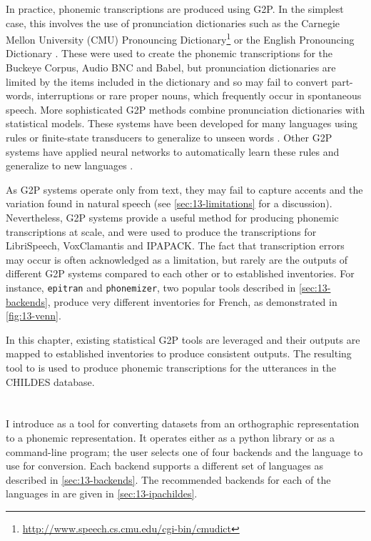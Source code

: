 In practice, phonemic transcriptions are produced using G2P. In the simplest case, this involves the use of pronunciation dictionaries such as the Carnegie Mellon University (CMU) Pronouncing Dictionary\footnote{\url{http://www.speech.cs.cmu.edu/cgi-bin/cmudict}} or the English Pronouncing Dictionary \citep{jones2011cambridge}. These were used to create the phonemic transcriptions for the Buckeye Corpus, Audio BNC and Babel, but pronunciation dictionaries are limited by the items included in the dictionary and so may fail to convert part-words, interruptions or rare proper nouns, which frequently occur in spontaneous speech. More sophisticated G2P methods combine pronunciation dictionaries with statistical models. These systems have been developed for many languages using rules or finite-state transducers to generalize to unseen words \citep{Mortensen-et-al:2018, johnson2020g2p, Bernard2021}. Other G2P systems have applied neural networks to automatically learn these rules and generalize to new languages \citep{NOVAK_MINEMATSU_HIROSE_2016, Zhu2022}.

As G2P systems operate only from text, they may fail to capture accents and the variation found in natural speech (see \cref{sec:13-limitations} for a discussion). Nevertheless, G2P systems provide a useful method for producing phonemic transcriptions at scale, and were used to produce the transcriptions for LibriSpeech, VoxClamantis and IPAPACK. The fact that transcription errors may occur is often acknowledged as a limitation, but rarely are the outputs of different G2P systems compared to each other or to established inventories. For instance, \texttt{epitran} and \texttt{phonemizer}, two popular tools described in \cref{sec:13-backends}, produce very different inventories for French, as demonstrated in \cref{fig:13-venn}. 

In this chapter, existing statistical G2P tools are leveraged and their outputs are mapped to established \phoible inventories to produce consistent outputs. The resulting tool to is used to produce phonemic transcriptions for the utterances in the CHILDES database.

\section{\gpp}

I introduce \gpp as a tool for converting datasets from an orthographic representation to a phonemic representation. It operates either as a python library or as a command-line program; the user selects one of four backends and the language to use for conversion. Each backend supports a different set of languages as described in \cref{sec:13-backends}. The recommended backends for each of the languages in \ipachildes are given in \cref{sec:13-ipachildes}.

